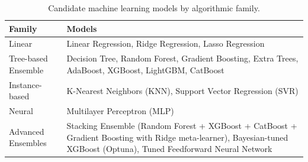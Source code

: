 \begin{table}[H]
\centering
\renewcommand{\arraystretch}{1.2}
\begin{tabular}{|p{4cm}|p{10cm}|}
\hline
\textbf{Family} & \textbf{Models} \\ \hline

Linear &
Linear Regression, Ridge Regression, Lasso Regression \\ \hline

Tree-based Ensemble &
Decision Tree, Random Forest, Gradient Boosting, Extra Trees, AdaBoost, XGBoost, LightGBM, CatBoost \\ \hline

Instance-based &
K-Nearest Neighbors (KNN), Support Vector Regression (SVR) \\ \hline

Neural &
Multilayer Perceptron (MLP) \\ \hline

Advanced Ensembles &
Stacking Ensemble (Random Forest + XGBoost + CatBoost + Gradient Boosting with Ridge meta-learner), Bayesian-tuned XGBoost (Optuna), Tuned Feedforward Neural Network \\ \hline

\end{tabular}
\caption{Candidate machine learning models by algorithmic family.}
\label{tab:model_families}
\end{table}

